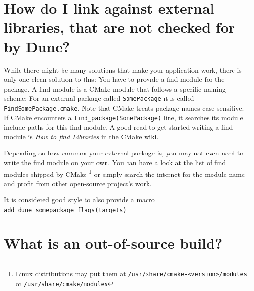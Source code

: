\documentclass[a4paper,10pt,DIV9,headings=small]{scrartcl}
\begin{document}
\section{How do I link against external libraries, that are not checked for by Dune?}
\label{external}

While there might be many solutions that make your application work, there is only one clean solution to this: You have
to provide a find module for the package. A find module is a CMake module that follows a specific naming scheme: For
an external package called \lstinline!SomePackage! it is called \lstinline!FindSomePackage.cmake!. Note that CMake
treats package names case sensitive. If CMake encounters a \lstinline!find_package(SomePackage)! line, it searches
its module include paths for this find module. A good read to get started writing a find module is
\href{http://www.cmake.org/Wiki/CMake:How_To_Find_Libraries}{\emph{How to find Libraries}} in the CMake wiki.

Depending on how common your external package is, you may not even need to write the find module on your own.
You can have a look at the list of find modules shipped by CMake \footnote{Linux distributions may put them at
\lstinline!/usr/share/cmake-<version>/modules! or \lstinline!/usr/share/cmake/modules!} or simply search the
internet for the module name and profit from other open-source project's work.

It is considered good style to also provide a macro \lstinline!add_dune_somepackage_flags(targets)!.

\section{What is an out-of-source build?}
\label{outofsource}
\end{document}
